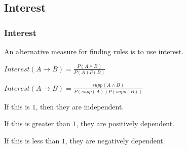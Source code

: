 
\subsection{Interest}

\subsubsection{Interest}

An alternative measure for finding rules is to use interest.

\(Interest(A\rightarrow B)=\frac{P(A\land B)}{P(A)P(B)}\)

\(Interest(A\rightarrow B)=\frac{supp(A\land B)}{P(supp(A))P(supp(B))}\)

If this is \(1\), then they are independent.

If this is greater than \(1\), they are positively dependent.

If this is less than \(1\), they are negatively dependent.

